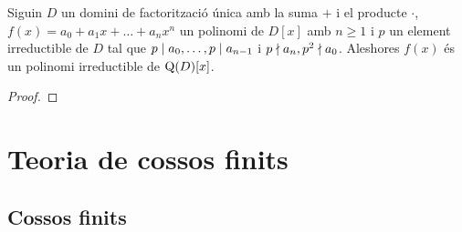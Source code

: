 \documentclass[../Apunts.tex]{subfiles}
\begin{document}
	\begin{corollary}
		Siguin \(D\) un domini de factorització única amb la suma \(+\) i el producte \(\cdot\), \(f(x)=a_{0}+a_{1}x+\dots+a_{n}x^{n}\) un polinomi de \(D[x]\) amb \(n\geq1\) i \(p\) un element irreductible de \(D\) tal que \(p\mathrel{|} a_{0},\dots,p\mathrel{|} a_{n-1}\) i \(p\mathrel{\nmid} a_{n},p^{2}\mathrel{\nmid} a_{0}\). Aleshores \(f(x)\) és un polinomi irreductible de \(\operatorname{Q}(D)[x]\).
		\begin{proof}
		\end{proof}
	\end{corollary}
\chapter{Teoria de cossos finits}
	\section{Cossos finits}
\end{document}
